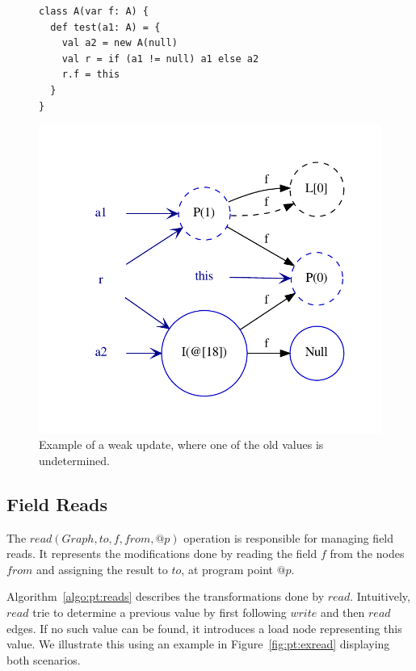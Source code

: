 \begin{figure}[h]
\begin{minipage}[tl]{0.5\linewidth}
    \centering
\lstset{linewidth=0.6\linewidth}
\begin{lstlisting}
class A(var f: A) {
  def test(a1: A) = {
    val a2 = new A(null)
    val r = if (a1 != null) a1 else a2
    r.f = this
  }
}
\end{lstlisting}
\end{minipage}
\begin{minipage}[tr]{0.7\linewidth}
    \centering
    \includegraphics[scale=0.7]{images/pt_exwrite}
\end{minipage}
    \caption{Example of a weak update, where one of the old values is
undetermined.}
    \label{fig:pt:exwrite}
\end{figure}
\FloatBarrier
\subsection{Field Reads}
The $read(Graph, to, f, from, @p)$ operation is responsible for
managing field reads. It represents the modifications done by reading the field
$f$ from the nodes $from$ and assigning the result to $to$, at program point
$@p$.

Algorithm~\ref{algo:pt:reads} describes the transformations done by $read$.
Intuitively, $read$ trie to determine a previous value by first following
$write$ and then $read$ edges. If no such value can be found, it introduces
a load node representing this value. We illustrate this using an example in
Figure~\ref{fig:pt:exread} displaying both scenarios.

